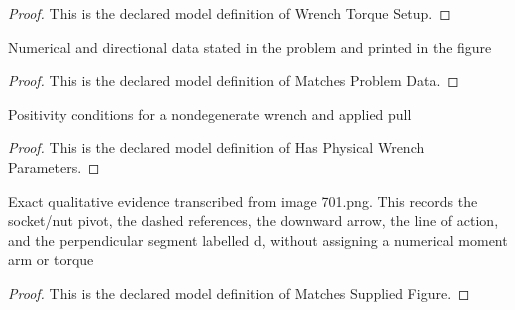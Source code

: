 \begin{proof}
  This is the declared model definition of Wrench Torque Setup.
\end{proof}
\begin{definition}
  \label{def:physics:phyx-mini-0701:phyxminiproblems-problemphyxmini0701-matchesproblemdata}
  Numerical and directional data stated in the problem and printed in the figure
\end{definition}
\begin{proof}
  This is the declared model definition of Matches Problem Data.
\end{proof}
\begin{definition}
  \label{def:physics:phyx-mini-0701:phyxminiproblems-problemphyxmini0701-hasphysicalwrenchparameters}
  Positivity conditions for a nondegenerate wrench and applied pull
\end{definition}
\begin{proof}
  This is the declared model definition of Has Physical Wrench Parameters.
\end{proof}
\begin{definition}
  \label{def:physics:phyx-mini-0701:phyxminiproblems-problemphyxmini0701-matchessuppliedfigure}
  Exact qualitative evidence transcribed from image 701.png. This records the socket/nut pivot, the dashed references, the downward arrow, the line of action, and the perpendicular segment labelled d, without assigning a numerical moment arm or torque
\end{definition}
\begin{proof}
  This is the declared model definition of Matches Supplied Figure.
\end{proof}

